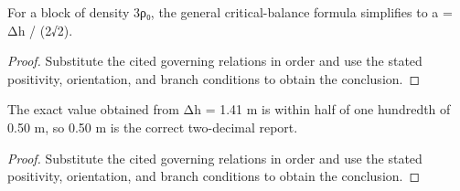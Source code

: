 \begin{lemma}
  \label{lem:physics:IPhO_2026_1_A_1:aux021}
  For a block of density 3ρ₀, the general critical-balance formula simplifies to a = Δh / (2√2).
\end{lemma}
\begin{proof}
  Substitute the cited governing relations in order and use the stated positivity, orientation, and branch conditions to obtain the conclusion.
\end{proof}

\begin{lemma}
  \label{lem:physics:IPhO_2026_1_A_1:aux022}
  The exact value obtained from Δh = 1.41 m is within half of one hundredth of 0.50 m, so 0.50 m is the correct two-decimal report.
\end{lemma}
\begin{proof}
  Substitute the cited governing relations in order and use the stated positivity, orientation, and branch conditions to obtain the conclusion.
\end{proof}
